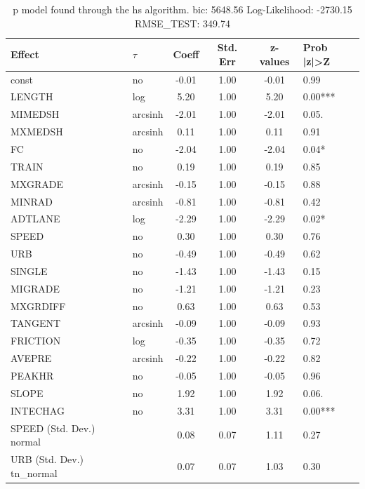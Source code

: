 \begin{table}
	\caption{p model found through the hs algorithm. bic: 5648.56 Log-Likelihood: -2730.15 RMSE_TEST: 349.74}
	\begin{center}
		\begin{tabular}{|l|l|c|c|c|l|}
			\hline
			Effect & $\tau$ & Coeff & Std. Err & z-values & Prob |z|>Z \\
			\hline
			const & no & -0.01 & 1.00 & -0.01 & 0.99 \\
			\hline
			LENGTH & log & 5.20 & 1.00 & 5.20 & 0.00*** \\
			\hline
			MIMEDSH & arcsinh & -2.01 & 1.00 & -2.01 & 0.05. \\
			\hline
			MXMEDSH & arcsinh & 0.11 & 1.00 & 0.11 & 0.91 \\
			\hline
			FC & no & -2.04 & 1.00 & -2.04 & 0.04* \\
			\hline
			TRAIN & no & 0.19 & 1.00 & 0.19 & 0.85 \\
			\hline
			MXGRADE & arcsinh & -0.15 & 1.00 & -0.15 & 0.88 \\
			\hline
			MINRAD & arcsinh & -0.81 & 1.00 & -0.81 & 0.42 \\
			\hline
			ADTLANE & log & -2.29 & 1.00 & -2.29 & 0.02* \\
			\hline
			SPEED & no & 0.30 & 1.00 & 0.30 & 0.76 \\
			\hline
			URB & no & -0.49 & 1.00 & -0.49 & 0.62 \\
			\hline
			SINGLE & no & -1.43 & 1.00 & -1.43 & 0.15 \\
			\hline
			MIGRADE & no & -1.21 & 1.00 & -1.21 & 0.23 \\
			\hline
			MXGRDIFF & no & 0.63 & 1.00 & 0.63 & 0.53 \\
			\hline
			TANGENT & arcsinh & -0.09 & 1.00 & -0.09 & 0.93 \\
			\hline
			FRICTION & log & -0.35 & 1.00 & -0.35 & 0.72 \\
			\hline
			AVEPRE & arcsinh & -0.22 & 1.00 & -0.22 & 0.82 \\
			\hline
			PEAKHR & no & -0.05 & 1.00 & -0.05 & 0.96 \\
			\hline
			SLOPE & no & 1.92 & 1.00 & 1.92 & 0.06. \\
			\hline
			INTECHAG & no & 3.31 & 1.00 & 3.31 & 0.00*** \\
			\hline
			SPEED (Std. Dev.) normal &  & 0.08 & 0.07 & 1.11 & 0.27 \\
			\hline
			URB (Std. Dev.) tn_normal &  & 0.07 & 0.07 & 1.03 & 0.30 \\

\end{tabular}
\end{center}
\end{table}
